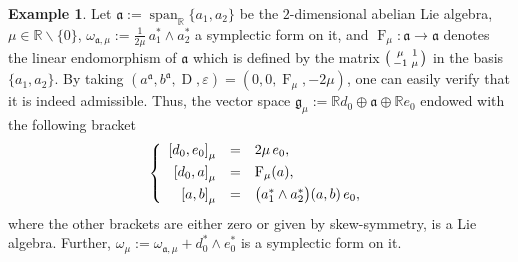 \documentclass[final,1p,times,nopreprintline]{elsarticle}
\theoremstyle{definition}
\newtheorem{example}{Example}[section]
\numberwithin{equation}{section}
\newcommand{\rel}{\mathbb{R}}
\newcommand{\w}{\omega}
\newcommand{\g}{\mathfrak{g}}
\newcommand{\ai}{\mathfrak{a}}
\newcommand{\Span}{\operatorname{span}}
\numberwithin{equation}{section}
\newcommand{\D}{\operatorname{D}}
\newcommand{\ef}{\operatorname{F}}
\begin{document}
\begin{example}
	Let $\ai:=\Span_\rel\{a_1,a_2\}$ be the $2$-dimensional abelian Lie algebra, $\mu\in\rel\backslash\{0\}$, $\w_{\ai,\mu}:=\tfrac{1}{2\mu}\,a_1^*\wedge a_2^*$ a symplectic form on it, and $\ef_\mu:\ai\to\ai$ denotes the linear endomorphism of $\ai$ which is defined by the matrix $\begin{psmallmatrix}
		\mu&1\\
		-1&\mu
	\end{psmallmatrix}$ in the basis $\{a_1,a_2\}$. By taking $(a^\ai,b^\ai,\D,\varepsilon)=(0,0,\ef_\mu,-2\mu)$, one can easily verify that it is indeed admissible. Thus, the vector space $\g_\mu:=\rel d_0\oplus\ai\oplus\rel e_0$ endowed with the following bracket
	\begin{equation*}
		\left\{
		\begin{array}{r c l}\vspace{1mm}
			\left[d_0,e_0\right]_\mu&=&2\mu\,e_0,\\\vspace{1mm}
			\left[d_0,a\right]_\mu&=&\ef_\mu(a),\\
			\left[a,b\right]_\mu&=&\big(a_1^*\wedge a_2^*\big)(a,b)\,e_0,
		\end{array}
		\right.\\
	\end{equation*}
	where the other brackets are either zero or given by skew-symmetry, is a Lie algebra. Further, $\w_\mu:=\w_{\ai,\mu}+d_0^*\wedge e_0^*$ is a symplectic form on it.
\end{example}
\end{document}
